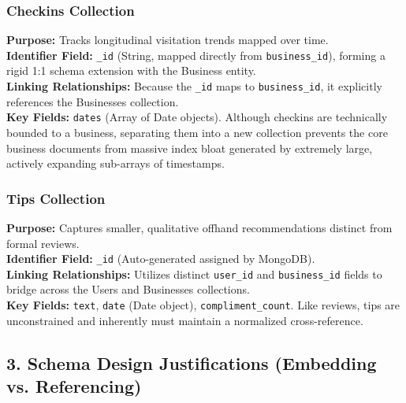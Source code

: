 \documentclass[11pt,a4paper]{article}
\begin{document}
\subsubsection*{Checkins Collection}
\textbf{Purpose:} Tracks longitudinal visitation trends mapped over time.\\
\textbf{Identifier Field:} \texttt{\_id} (String, mapped directly from \texttt{business\_id}), forming a rigid 1:1 schema extension with the Business entity.\\
\textbf{Linking Relationships:} Because the \texttt{\_id} maps to \texttt{business\_id}, it explicitly references the Businesses collection.\\
\textbf{Key Fields:} \texttt{dates} (Array of Date objects). Although checkins are technically bounded to a business, separating them into a new collection prevents the core business documents from massive index bloat generated by extremely large, actively expanding sub-arrays of timestamps.

\subsubsection*{Tips Collection}
\textbf{Purpose:} Captures smaller, qualitative offhand recommendations distinct from formal reviews.\\
\textbf{Identifier Field:} \texttt{\_id} (Auto-generated assigned by MongoDB).\\
\textbf{Linking Relationships:} Utilizes distinct \texttt{user\_id} and \texttt{business\_id} fields to bridge across the Users and Businesses collections.\\
\textbf{Key Fields:} \texttt{text}, \texttt{date} (Date object), \texttt{compliment\_count}. Like reviews, tips are unconstrained and inherently must maintain a normalized cross-reference.

\subsection*{3. Schema Design Justifications (Embedding vs. Referencing)}
\end{document}
